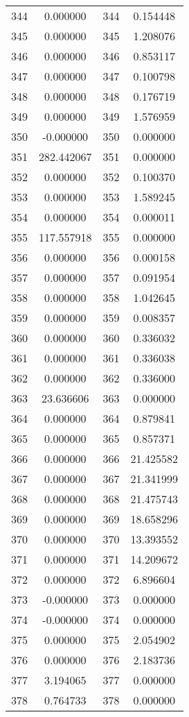 \documentclass[12pt]{article}
\begin{document}
\begin{longtable}{@{}cccc@{}}
344 & 0.000000 & 344 & 0.154448 \\
345 & 0.000000 & 345 & 1.208076 \\
346 & 0.000000 & 346 & 0.853117 \\
347 & 0.000000 & 347 & 0.100798 \\
348 & 0.000000 & 348 & 0.176719 \\
349 & 0.000000 & 349 & 1.576959 \\
350 & -0.000000 & 350 & 0.000000 \\
351 & 282.442067 & 351 & 0.000000 \\
352 & 0.000000 & 352 & 0.100370 \\
353 & 0.000000 & 353 & 1.589245 \\
354 & 0.000000 & 354 & 0.000011 \\
355 & 117.557918 & 355 & 0.000000 \\
356 & 0.000000 & 356 & 0.000158 \\
357 & 0.000000 & 357 & 0.091954 \\
358 & 0.000000 & 358 & 1.042645 \\
359 & 0.000000 & 359 & 0.008357 \\
360 & 0.000000 & 360 & 0.336032 \\
361 & 0.000000 & 361 & 0.336038 \\
362 & 0.000000 & 362 & 0.336000 \\
363 & 23.636606 & 363 & 0.000000 \\
364 & 0.000000 & 364 & 0.879841 \\
365 & 0.000000 & 365 & 0.857371 \\
366 & 0.000000 & 366 & 21.425582 \\
367 & 0.000000 & 367 & 21.341999 \\
368 & 0.000000 & 368 & 21.475743 \\
369 & 0.000000 & 369 & 18.658296 \\
370 & 0.000000 & 370 & 13.393552 \\
371 & 0.000000 & 371 & 14.209672 \\
372 & 0.000000 & 372 & 6.896604 \\
373 & -0.000000 & 373 & 0.000000 \\
374 & -0.000000 & 374 & 0.000000 \\
375 & 0.000000 & 375 & 2.054902 \\
376 & 0.000000 & 376 & 2.183736 \\
377 & 3.194065 & 377 & 0.000000 \\
378 & 0.764733 & 378 & 0.000000 \\

\end{longtable}
\end{document}
